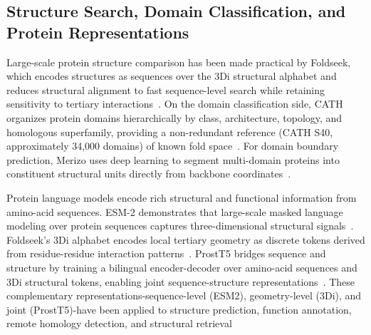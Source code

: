 \documentclass[letterpaper]{article} %
\begin{document}



\subsection{Structure Search, Domain Classification, and Protein Representations}

Large-scale protein structure comparison has been made practical by Foldseek, which encodes structures as sequences over the 3Di structural alphabet and reduces structural alignment to fast sequence-level search while retaining sensitivity to tertiary interactions~\cite{vankempen2024foldseek}. On the domain classification side, CATH organizes protein domains hierarchically by class, architecture, topology, and homologous superfamily, providing a non-redundant reference (CATH S40, approximately 34,000 domains) of known fold space~\cite{cath}. For domain boundary prediction, Merizo uses deep learning to segment multi-domain proteins into constituent structural units directly from backbone coordinates~\cite{merizo}.

Protein language models encode rich structural and functional information from amino-acid sequences. ESM-2 demonstrates that large-scale masked language modeling over protein sequences captures three-dimensional structural signals~\cite{lin2023esm2}. Foldseek's 3Di alphabet encodes local tertiary geometry as discrete tokens derived from residue-residue interaction patterns~\cite{vankempen2024foldseek}. ProstT5 bridges sequence and structure by training a bilingual encoder-decoder over amino-acid sequences and 3Di structural tokens, enabling joint sequence-structure representations~\cite{heinzinger2024prostt5}. These complementary representations-sequence-level (ESM2), geometry-level (3Di), and joint (ProstT5)-have been applied to structure prediction, function annotation, remote homology detection, and structural retrieval
\end{document}
